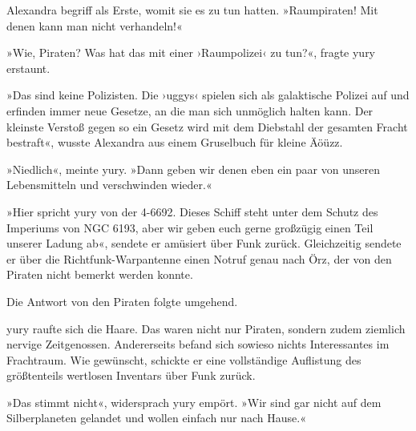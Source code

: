 
Alexandra begriff als Erste, womit sie es zu tun hatten. »Raumpiraten! Mit denen kann man nicht verhandeln!«

»Wie, Piraten? Was hat das mit einer ›Raumpolizei‹ zu tun?«, fragte yury erstaunt.

»Das sind keine Polizisten. Die ›uggys‹ spielen sich als galaktische Polizei auf und erfinden immer neue Gesetze, an die man sich unmöglich halten kann. Der kleinste Verstoß gegen so ein Gesetz wird mit dem Diebstahl der gesamten Fracht bestraft«, wusste Alexandra aus einem Gruselbuch für kleine Äöüzz.

»Niedlich«, meinte yury. »Dann geben wir denen eben ein paar von unseren Lebensmitteln und verschwinden wieder.«

»Hier spricht yury von der 4-6692. Dieses Schiff steht unter dem Schutz des Imperiums von NGC 6193, aber wir geben euch gerne großzügig einen Teil unserer Ladung ab«, sendete er amüsiert über Funk zurück. Gleichzeitig sendete er über die Richtfunk-Warpantenne einen Notruf genau nach Örz, der von den Piraten nicht bemerkt werden konnte.

Die Antwort von den Piraten folgte umgehend. 

yury raufte sich die Haare. Das waren nicht nur Piraten, sondern zudem ziemlich nervige Zeitgenossen. Andererseits befand sich sowieso nichts Interessantes im Frachtraum. Wie gewünscht, schickte er eine vollständige Auflistung des größtenteils wertlosen Inventars über Funk zurück.


»Das stimmt nicht«, widersprach yury empört. »Wir sind gar nicht auf dem Silberplaneten gelandet und wollen einfach nur nach Hause.«


